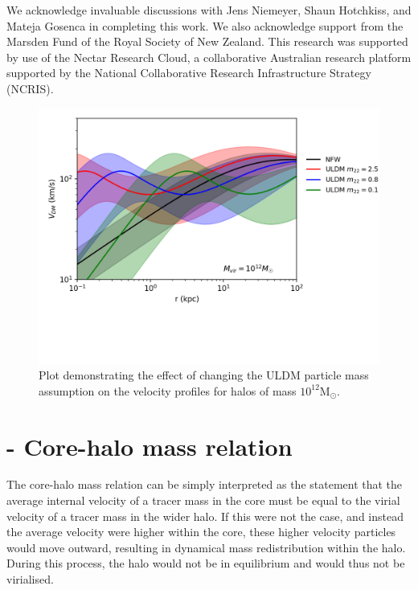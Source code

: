 \documentclass{pasa}%
\begin{document}
\begin{acknowledgements}
We acknowledge invaluable discussions with Jens Niemeyer, Shaun Hotchkiss, and Mateja Gosenca in completing this work. We also acknowledge support from the Marsden Fund of the Royal Society of New Zealand. This research was supported by use of the Nectar Research Cloud, a collaborative Australian research platform supported by the National Collaborative Research Infrastructure Strategy (NCRIS).

\end{acknowledgements}


\begin{appendix}

\begin{figure}[t]
\centering
\includegraphics[scale = 0.8, trim={0cm 2.5cm 1cm 0cm}]{000_comp_10_12.png} 
\caption{Plot demonstrating the effect of changing the ULDM particle mass assumption on the velocity profiles for halos of mass $10^{12}\mathrm{M}_{\odot}$.}\label{fig:vel_5_10_11}
\end{figure}

\section{ - Core-halo mass relation}\label{app:core-halo}

 The core-halo mass relation can be simply interpreted as the statement that the average internal velocity of a tracer mass in the core must be equal to the virial velocity of a tracer mass in the wider halo. If this were not the case, and instead the average velocity were higher within the core, these higher velocity particles would move outward, resulting in dynamical mass redistribution within the halo. During this process, the halo would not be in equilibrium and would thus not be virialised.


\end{appendix}
\end{document}
